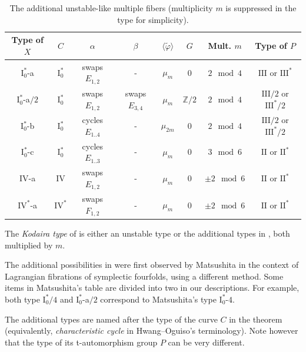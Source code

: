 \documentclass[reqno, letterpaper]{amsart}
\numberwithin{equation}{subsection}
\newcommand{\ZZ}{\mathbb{Z}}
\begin{document}
		\begin{table}[t]
			\begin{tabular}{|c||c|c|c|c|c||c|c|} \hline
				Type of $X$ & $C$ & $\alpha$ & $\beta$ & $\langle \tilde \varphi \rangle$ & $G$ & Mult. $m$ & Type of $P$ \\\hline\hline
				$\mathrm I_0^*$-a & $\mathrm I_0^*$ & swaps $E_{1,2}$ & - & $\mu_m$ & $0$ & $2 \mod 4$ & $\mathrm{III}$ or $\mathrm{III}^*$ \\\hline
				$\mathrm I_0^*$-a$/2$ & $\mathrm I_0^*$ & swaps $E_{1,2}$ & swaps $E_{3,4}$ & $\mu_m$ & $\ZZ/2$ & $2 \mod 4$ & $\mathrm{III}/2$ or $\mathrm{III}^*/2$ \\\hline
				$\mathrm I_0^*$-b & $\mathrm I_0^*$ & cycles $E_{1 .. 4}$ & - & $\mu_{2m}$ & $0$ & $2 \mod 4$ & $\mathrm{III}/2$ or $\mathrm{III}^*/2$ \\\hline
				$\mathrm I_0^*$-c & $\mathrm I_0^*$ & cycles $E_{1 .. 3}$ & - & $\mu_m$ & $0$ & $3 \mod 6$ & $\mathrm{II}$ or $\mathrm{II}^*$ \\\hline
				$\mathrm{IV}$-a & $\mathrm{IV}$ & swaps $E_{1,2}$ & - & $\mu_m$ & $0$ & $\pm2 \mod 6$ & $\mathrm{II}$ or $\mathrm{II}^*$ \\\hline
				$\mathrm{IV}^*$-a & $\mathrm{IV}^*$ & swaps $F_{1,2}$ & - & $\mu_m$ & $0$ & $\pm2 \mod 6$ & $\mathrm{II}$ or $\mathrm{II}^*$ \\\hline
			\end{tabular}
			\caption{The additional unstable-like multiple fibers (multiplicity $m$ is suppressed in the type for simplicity).}
			\label{table:exceptional unstable-like fibers}
		\end{table}
		
		\begin{definition}
			The \emph{Kodaira type} of  is either an unstable type or the additional types in , both multiplied by $m$.
		\end{definition}
		
		\begin{remark} \label{rmk:classification of multiple fiber v:exceptional cases}
			The additional possibilities in  were first observed by Matsushita \cite[Table~4]{mat01} in the context of Lagrangian fibrations of symplectic fourfolds, using a different method. Some items in Matsushita's table are divided into two in our descriptions. For example, both type $\mathrm I_0^*/4$ and $\mathrm I_0^*$-a$/2$ correspond to Matsushita's type $\mathrm I_0^*$-$4$.
			
			The additional types are named after the type of the curve $C$ in the theorem (equivalently, \emph{characteristic cycle} in Hwang--Oguiso's terminology). Note however that the type of its t-automorphism group $P$ can be very different.
		\end{remark}
		
\end{document}
